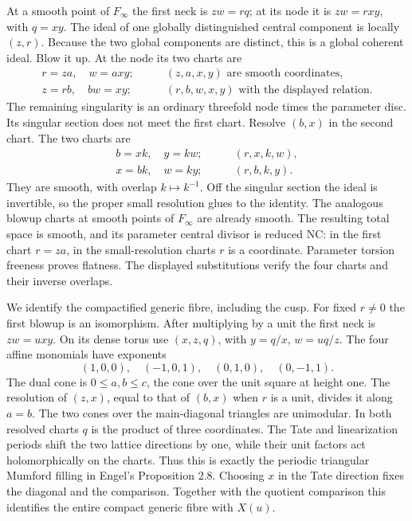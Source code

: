 \item At a smooth point of $F_\infty$ the first neck is $zw=rq$; at its node it is $zw=rxy$, with $q=xy$. The ideal of one globally distinguished central component is locally $(z,r)$. Because the two global components are distinct, this is a global coherent ideal. Blow it up. At the node its two charts are
\begin{align*}
 r=za,\quad w=axy;&\qquad (z,a,x,y)\text{ are smooth coordinates},\\
 z=rb,\quad bw=xy;&\qquad (r,b,w,x,y)\text{ with the displayed relation}.
\end{align*}
The remaining singularity is an ordinary threefold node times the parameter disc. Its singular section does not meet the first chart. Resolve $(b,x)$ in the second chart. The two charts are
\begin{align*}
 b=xk,\quad y=kw;&\qquad (r,x,k,w),\\
 x=bk,\quad w=ky;&\qquad (r,b,k,y).
\end{align*}
They are smooth, with overlap $k\mapsto k^{-1}$. Off the singular section the ideal is invertible, so the proper small resolution glues to the identity. The analogous blowup charts at smooth points of $F_\infty$ are already smooth. The resulting total space is smooth, and its parameter central divisor is reduced NC: in the first chart $r=za$, in the small-resolution charts $r$ is a coordinate. Parameter torsion freeness proves flatness. The displayed substitutions verify the four charts and their inverse overlaps.

\item We identify the compactified generic fibre, including the cusp. For fixed $r\ne0$ the first blowup is an isomorphism. After multiplying by a unit the first neck is $zw=u xy$. On its dense torus use $(x,z,q)$, with $y=q/x$, $w=uq/z$. The four affine monomials have exponents
\[
 (1,0,0),\quad(-1,0,1),\quad(0,1,0),\quad(0,-1,1).
\]
The dual cone is $0\le a,b\le c$, the cone over the unit square at height one. The resolution of $(z,x)$, equal to that of $(b,x)$ when $r$ is a unit, divides it along $a=b$. The two cones over the main-diagonal triangles are unimodular. In both resolved charts $q$ is the product of three coordinates. The Tate and linearization periods shift the two lattice directions by one, while their unit factors act holomorphically on the charts. Thus this is exactly the periodic triangular Mumford filling in Engel's Proposition 2.8. Choosing $x$ in the Tate direction fixes the diagonal and the comparison. Together with the quotient comparison this identifies the entire compact generic fibre with $X(u)$.

